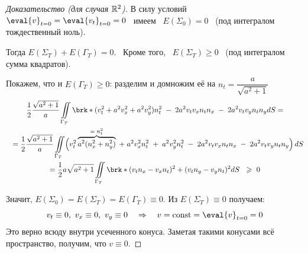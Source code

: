 \documentclass[../main.tex]{subfiles}
\begin{document}
\begin{proof}[Доказательство (для случая $\mathbb{R}^2$)]
В силу условий $ \eval{v}_{t=0} = \eval{v_t}_{t=0} = 0$ \ имеем \ $ E(\Sigma_0)=0 $ \ (под интегралом тождественный ноль).

Тогда $ E(\Sigma_T)+E(\Gamma_T)=0 $. \ 
Кроме того, \ $ E(\Sigma_T)\geq 0 $ \ (под интегралом сумма квадратов).
\vspace{0.5em}

Покажем, что и $ E(\Gamma_T)\geq 0 $: разделим и домножим её на $ n_t=\dfrac{a}{\sqrt{a^2+1}} $
\begin{multline*}
  \frac{1}{2}\frac{\sqrt{a^2+1}}{a}\iint\limits_{\Gamma_T}\brk*{(v^2_t+a^2v^2_x+a^2v^2_y)n^2_t \; - \; 2a^2v_tv_xn_tn_x \; - \; 2a^2v_tv_yn_tn_y} dS = \\ \shoveleft{
  =\frac{1}{2}\frac{\sqrt{a^2+1}}{a}\iint\limits_{\Gamma_T} \Bigl( v^2_t \overbrace{a^2(n^2_x + n^2_y)}^\text{= $n_t^2$}\; + \; a^2v^2_xn^2_t \; + \; a^2v^2_yn^2_t\; - \; 2a^2v_tv_xn_tn_x \; - \; 2a^2 v_t v_y n_t n_y \Bigr)\, dS }\\
  = \frac{1}{2} a \sqrt{a^2+1} \iint\limits_{\Gamma_T} \brk*{(v_tn_x -v_xn_t)^2+(v_tn_y-v_yn_t)^2} dS \;\ \geq\ 0  
\end{multline*}

Значит,\; $ E(\Sigma_0)=E(\Sigma_T)=E(\Gamma_T)\equiv 0.$
\; Из $ E(\Sigma_T)\equiv 0 $ получаем: 
$$ v_t\equiv 0,\ v_x\equiv 0,\ v_y\equiv 0 \quad \Rightarrow \quad v = \text{const} = \eval{v}_{t=0} = 0 
$$
Это верно всюду внутри усеченного конуса.
Заметая такими конусами всё пространство, получим, что $ v \equiv 0 $.
\end{proof}
\end{document}
